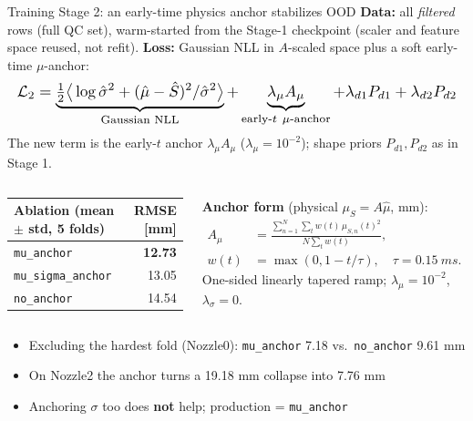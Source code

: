 \documentclass[aspectratio=169,11pt]{beamer}
\newcommand{\good}[1]{\textcolor{goodGreen}{#1}}
\newcommand{\warn}[1]{\textcolor{warnRed}{#1}}
\begin{document}
\begin{frame}{Training Stage 2: an early-time physics anchor stabilizes OOD}
\small
\textbf{Data:} all \emph{filtered} rows (full QC set), warm-started from the Stage-1
checkpoint (scaler and feature space reused, not refit). \textbf{Loss:} Gaussian NLL
in $A$-scaled space plus a soft early-time $\mu$-anchor:
\[
\resizebox{\linewidth}{!}{$\displaystyle
\mathcal{L}_2=\underbrace{\tfrac12\big\langle \log\hat\sigma^2+(\hat\mu-\hat S)^2/\hat\sigma^2\big\rangle}_{\text{Gaussian NLL}}
+\underbrace{\lambda_\mu A_\mu}_{\text{early-}t\ \mu\text{-anchor}}
+\lambda_{d1}P_{d1}+\lambda_{d2}P_{d2}
$}
\]
\vspace{-4pt}
{\scriptsize The new term is the early-$t$ anchor $\lambda_\mu A_\mu$ ($\lambda_\mu{=}10^{-2}$); shape priors $P_{d1},P_{d2}$ as in Stage 1.}

\vspace{0.3em}
\begin{columns}[T,onlytextwidth]
\footnotesize
\renewcommand{\arraystretch}{1.05}
\begin{tabular}{@{}lr@{}}
\toprule
\textbf{Ablation (mean $\pm$ std, 5 folds)} & \textbf{RMSE [mm]} \\
\midrule
\texttt{mu\_anchor} & \good{\textbf{12.73}} \\
\texttt{mu\_sigma\_anchor} & 13.05 \\
\texttt{no\_anchor} & \warn{14.54} \\
\bottomrule
\end{tabular}
\scriptsize
\setlength{\abovedisplayskip}{1pt}
\setlength{\belowdisplayskip}{1pt}
\textbf{Anchor form} (physical $\mu_S{=}A\hat\mu$, mm):
\[
\begin{aligned}
A_\mu &=
\frac{\sum_{n=1}^{N}\sum_t w(t)\,\mu_{S,n}(t)^2}
     {N\sum_t w(t)},\\[-2pt]
w(t)&=\max(0,1-t/\tau),\quad \tau=\SI{0.15}{ms}.
\end{aligned}
\]
\vspace{-8pt}
{\tiny One-sided linearly tapered ramp; $\lambda_\mu=10^{-2}$, $\lambda_\sigma=0$.}
\end{columns}

\vspace{0.4em}
\begin{itemize}\setlength\itemsep{2pt}
  \item Excluding the hardest fold (Nozzle0): \texttt{mu\_anchor} 7.18 vs.\ \texttt{no\_anchor} 9.61 mm
  \item On Nozzle2 the anchor turns a \warn{19.18 mm} collapse into \good{7.76 mm}
  \item Anchoring $\sigma$ too does \textbf{not} help; production = \texttt{mu\_anchor}
\end{itemize}
\end{frame}
\end{document}
